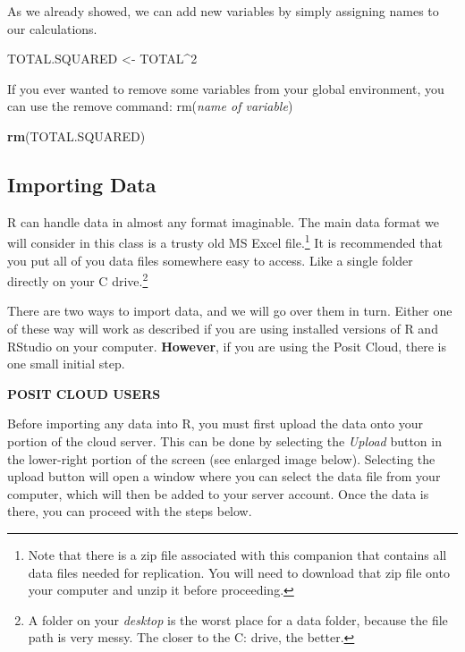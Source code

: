 \documentclass[
]{book}
\newenvironment{Shaded}{\begin{snugshade}}{\end{snugshade}}
\newcommand{\DecValTok}[1]{\textcolor[rgb]{0.00,0.00,0.81}{#1}}
\newcommand{\FunctionTok}[1]{\textcolor[rgb]{0.13,0.29,0.53}{\textbf{#1}}}
\newcommand{\NormalTok}[1]{#1}
\newcommand{\OtherTok}[1]{\textcolor[rgb]{0.56,0.35,0.01}{#1}}
\newcommand{\SpecialCharTok}[1]{\textcolor[rgb]{0.81,0.36,0.00}{\textbf{#1}}}
\begin{document}
As we already showed, we can add new variables by simply assigning names to our calculations.

\begin{Shaded}
\begin{Highlighting}[]
\NormalTok{TOTAL.SQUARED }\OtherTok{\textless{}{-}}\NormalTok{ TOTAL}\SpecialCharTok{\^{}}\DecValTok{2}
\end{Highlighting}
\end{Shaded}

If you ever wanted to remove some variables from your global environment, you can use the remove command: rm(\emph{name of variable})

\begin{Shaded}
\begin{Highlighting}[]
\FunctionTok{rm}\NormalTok{(TOTAL.SQUARED)}
\end{Highlighting}
\end{Shaded}

\subsection{Importing Data}\label{importing-data}

R can handle data in almost any format imaginable. The main data format we will consider in this class is a trusty old MS Excel file.\footnote{Note that there is a zip file associated with this companion that contains all data files needed for replication. You will need to download that zip file onto your computer and unzip it before proceeding.} It is recommended that you put all of you data files somewhere easy to access. Like a single folder directly on your C drive.\footnote{A folder on your \emph{desktop} is the worst place for a data folder, because the file path is very messy. The closer to the C: drive, the better.}

There are two ways to import data, and we will go over them in turn. Either one of these way will work as described if you are using installed versions of R and RStudio on your computer. \textbf{However}, if you are using the Posit Cloud, there is one small initial step.

\textbf{POSIT CLOUD USERS}

Before importing any data into R, you must first upload the data onto your portion of the cloud server. This can be done by selecting the \emph{Upload} button in the lower-right portion of the screen (see enlarged image below). Selecting the upload button will open a window where you can select the data file from your computer, which will then be added to your server account. Once the data is there, you can proceed with the steps below.
\end{document}
